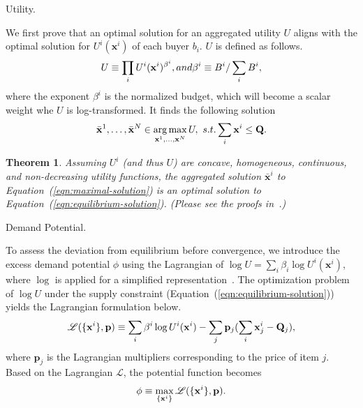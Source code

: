\documentclass[conference]{IEEEtran}
\theoremstyle{plain}
\newtheorem{theorem}{Theorem}
\DeclareMathOperator*{\argmax}{arg\,max}
\newcommand*{\defeq}{\equiv}
\begin{document}
\noindentAggregated Utility.

We first prove that an optimal solution for an aggregated utility $U$ aligns with the optimal solution for $U^i(\mathbf{x}^i)$ of each buyer $b_i$. $U$ is defined as follows.
\begin{equation}\small
    U \defeq \prod_i U^i(\mathbf{x}^i)^{\beta^i}  , and  \beta^i\defeq B^i/\sum_i B^i,
\end{equation}  
where the exponent $\beta^i$ is the normalized budget, which will become a scalar weight whe $U$ is log-transformed. It finds the following solution
\begin{equation}\small
    \label{eqn:maximal-solution}
     \bar{\mathbf{x}}^1,\ldots, \bar{\mathbf{x}}^N \in \argmax_{\mathbf{x}^1,\ldots, \mathbf{x}^N} U,\,\,s.t. \sum_i\mathbf{x}^i\leq \mathbf{Q}.
\end{equation}

\begin{theorem}
    \label{thm:aggregate=individual-equilibrium}
    Assuming $U^i$ (and thus $U$) are concave, homogeneous, continuous, and non-decreasing utility functions, the aggregated solution $\bar{\mathbf{x}}^i$ to Equation~(\ref{eqn:maximal-solution}) is an optimal solution to Equation~(\ref{eqn:equilibrium-solution}). (Please see the proofs in~\cite{supplementary}.)

\end{theorem}

\noindentExcess Demand Potential.

To assess the deviation from equilibrium before convergence, we introduce the excess demand potential $\phi$ using the Lagrangian of $\log U = \sum_{i} \beta_i \log U^i(\mathbf{x}^i)$, where $\log$ is applied for a simplified representation~\cite{devanur2008market}. The optimization problem of $\log U$ under the supply constraint (Equation~(\ref{eqn:equilibrium-solution})) yields the Lagrangian formulation below.
\begin{equation}\small
    \label{eqn:lagrangian}
    \mathscr{L}(\{\mathbf{x}^i\}, \mathbf{p}) \defeq \sum_i \beta^i\log U^i(\mathbf{x}^i) - \sum_j \mathbf{p}_j (\sum_i\mathbf{x}^i_j - \mathbf{Q}_j),
\end{equation}
where $\mathbf{p}_j$ is the Lagrangian multipliers corresponding to the price of item $j$. Based on the Lagrangian $\mathscr{L}$, the potential function becomes
\begin{equation}\small
    \label{eqn:potential-function}
    \phi \defeq \max_{\{\mathbf{x}^i\}} \mathscr{L}(\{\mathbf{x}^i\}, \mathbf{p}).
\end{equation}
\end{document}
